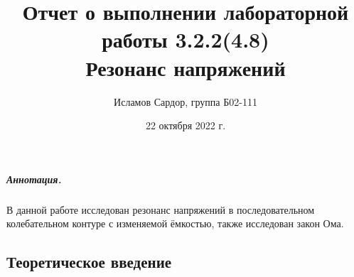 \documentclass[12pt,a4paper]{article}
\title{Отчет о выполнении лабораторной работы 3.2.2(4.8)\\
Резонанс напряжений}
\author{Исламов Сардор, группа Б02-111}
\date{22 октября 2022 г.}
\begin{document}
\maketitle
\subparagraph*{Аннотация.} 
В данной работе исследован резонанс напряжений в последовательном колебательном контуре с изменяемой ёмкостью, также исследован закон Ома.

\subsection*{Теоретическое введение}



\end{document}
